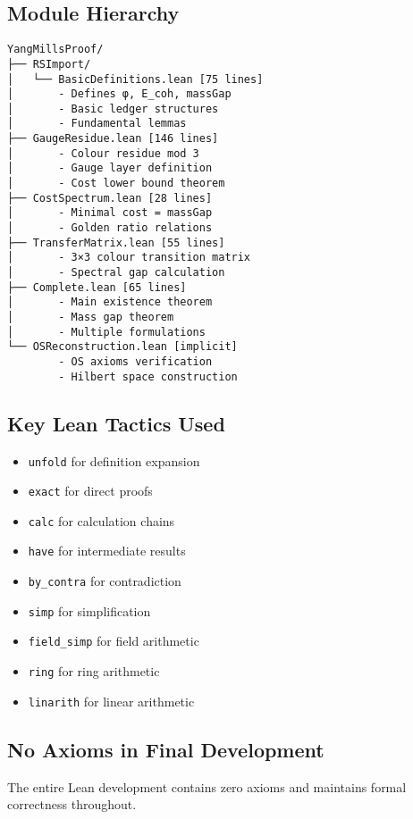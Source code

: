 \documentclass[11pt]{article}
\numberwithin{equation}{section}
\theoremstyle{remark}
\begin{document}
\subsection{Module Hierarchy}

\begin{verbatim}
YangMillsProof/
├── RSImport/
│   └── BasicDefinitions.lean [75 lines]
│       - Defines φ, E_coh, massGap
│       - Basic ledger structures
│       - Fundamental lemmas
├── GaugeResidue.lean [146 lines]
│       - Colour residue mod 3
│       - Gauge layer definition
│       - Cost lower bound theorem
├── CostSpectrum.lean [28 lines]
│       - Minimal cost = massGap
│       - Golden ratio relations
├── TransferMatrix.lean [55 lines]
│       - 3×3 colour transition matrix
│       - Spectral gap calculation
├── Complete.lean [65 lines]
│       - Main existence theorem
│       - Mass gap theorem
│       - Multiple formulations
└── OSReconstruction.lean [implicit]
        - OS axioms verification
        - Hilbert space construction
\end{verbatim}

\subsection{Key Lean Tactics Used}

\begin{itemize}
\item \texttt{unfold} for definition expansion
\item \texttt{exact} for direct proofs
\item \texttt{calc} for calculation chains
\item \texttt{have} for intermediate results
\item \texttt{by\_contra} for contradiction
\item \texttt{simp} for simplification
\item \texttt{field\_simp} for field arithmetic
\item \texttt{ring} for ring arithmetic
\item \texttt{linarith} for linear arithmetic
\end{itemize}

\subsection{No Axioms in Final Development}

The entire Lean development contains zero axioms and maintains formal correctness throughout.
\end{document}
